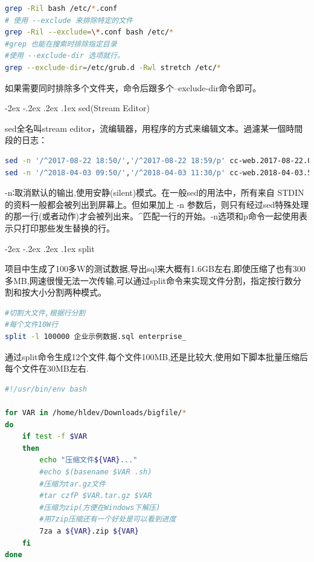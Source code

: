 \documentclass[12pt]{book}
\makeatletter
\numberwithin{dummy}{section}
\theoremstyle{ocrenumbox}
\theoremstyle{blacknumex}
\theoremstyle{blacknumbox}
\theoremstyle{ocrenum}
\renewcommand\paragraph{\@startsection{paragraph}{4}{\z@}
	{-2ex \@plus-.2ex \@minus .2ex}
	{.1ex}
	{\normalfont\small\sffamily\bfseries}}
\makeatother
\begin{document}
\begin{lstlisting}[language=Bash]
grep -Ril bash /etc/*.conf
# 使用 --exclude 来排除特定的文件
grep -Ril --exclude=\*.conf bash /etc/*
#grep 也能在搜索时排除指定目录
#使用 --exclude-dir 选项就行。
grep --exclude-dir=/etc/grub.d -Rwl stretch /etc/*
\end{lstlisting}

如果需要同时排除多个文件夹，命令后跟多个--exclude-dir命令即可。

\paragraph{sed(Stream Editor)}

sed全名叫stream editor，流编辑器，用程序的方式来编辑文本。過濾某一個時間段的日志：

\begin{lstlisting}[language=Bash]
sed -n '/^2017-08-22 18:50/','/^2017-08-22 18:59/p' cc-web.2017-08-22.0.log >> filter.log
sed -n '/^2018-04-03 09:50/','/^2018-04-03 11:30/p' cc-web.2018-04-03.5.log >> filter.log
\end{lstlisting}

-n∶取消默认的输出,使用安静(silent)模式。在一般sed的用法中，所有来自 STDIN的资料一般都会被列出到屏幕上。但如果加上 -n 参数后，则只有经过sed特殊处理的那一行(或者动作)才会被列出来。\^{}匹配一行的开始。-n选项和p命令一起使用表示只打印那些发生替换的行。


\paragraph{split}

项目中生成了100多W的测试数据,导出sql来大概有1.6GB左右,即使压缩了也有300多MB,网速很慢无法一次传输,可以通过split命令来实现文件分割，指定按行数分割和按大小分割两种模式。

\begin{lstlisting}[language=Bash]
#切割大文件,根据行分割
#每个文件10W行
split -l 100000 企业示例数据.sql enterprise_
\end{lstlisting}

通过split命令生成12个文件,每个文件100MB,还是比较大,使用如下脚本批量压缩后每个文件在30MB左右.

\begin{lstlisting}[language=Bash]
#!/usr/bin/env bash

for VAR in /home/hldev/Downloads/bigfile/*
do
	if test -f $VAR
	then
		echo "压缩文件${VAR}..."
		#echo $(basename $VAR .sh)
		#压缩为tar.gz文件
		#tar czfP $VAR.tar.gz $VAR
		#压缩为zip(方便在Windows下解压)
		#用7zip压缩还有一个好处是可以看到进度
		7za a ${VAR}.zip ${VAR}
	fi    
done
\end{lstlisting}
\end{document}
